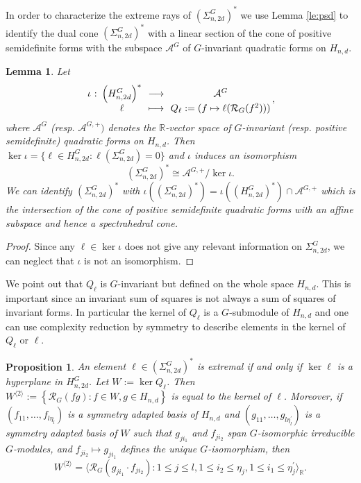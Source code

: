 \documentclass[11pt,a4paper]{amsart}
\newcommand{\abb}[5]{%
\setlength{\arraycolsep}{0.4ex}%
\begin{array}{rcccc}%
#1 &:\,& #2 & \,\,\longrightarrow\,\, & #3 \\[0.5ex]%
     & & #4 & \longmapsto & #5%
\end{array}%
}
\numberwithin{equation}{section}
\newtheorem{prop}[thm]{Proposition}
\newtheorem{lemma}[thm]{Lemma}
\theoremstyle{definition}
\newcommand{\R}{\mathbb{R}}
\numberwithin{thm}{section}
\theoremstyle{break}
\numberwithin{subcase}{case}
\begin{document}
In order to characterize the extreme rays of $\left( \Sigma_{n,2d}^G\right)^\ast$ we use Lemma \ref{le:psd} to identify the dual cone $\left( \Sigma_{n,2d}^G\right)^\ast$ with a linear section of the cone of positive semidefinite forms with the subspace $\mathcal{A}^{G}$ of $G$-invariant quadratic forms on $H_{n,d}$.

\begin{lemma}\label{Rmk:BoundaryOfPSD}
Let $$\abb{\iota}{\left(H_{n,2d}^G\right)^\ast}{\mathcal{A}^G}{\ell}{Q_\ell := ( f \mapsto \ell (\mathcal{R}_G (f^2) ))},$$
where $\mathcal{A}^G$ (resp. $\mathcal{A}^{G,+})$ denotes the $\R$-vector space of $G$-invariant (resp. positive semidefinite) quadratic forms on $H_{n,d}$. Then $\ker \iota = \{ \ell \in H_{n,2d}^G : \ell (\Sigma_{n,2d}^G) = 0 \}$ and $\iota$ induces an isomorphism $$\left(\Sigma_{n,2d}^G\right)^\ast \cong  \mathcal{A}^{G,+} / \ker \iota.$$ We can identify $\left( \Sigma_{n,2d}^G \right)^\ast$ with $\iota \left( \left( \Sigma_{n,2d}^G \right)^\ast\right) = \iota \left( \left( H_{n,2d}^G \right)^\ast\right) \cap \mathcal{A}^{G,+}$ which is the intersection of the cone of positive semidefinite quadratic forms with an affine subspace and hence a spectrahedral cone.
\end{lemma}
\begin{proof}
Since any $\ell \in \ker \iota$ does not give any relevant information on $\Sigma_{n,2d}^G$, we can neglect that $\iota$ is not an isomorphism.
\end{proof}
We point out that $Q_\ell$ is $G$-invariant but defined on the whole space $H_{n,d}$. This is important since an invariant sum of squares is not always a sum of squares of invariant forms.
In particular the kernel of $Q_\ell$ is a $G$-submodule of $H_{n,d}$ and one can use complexity reduction by symmetry to describe elements in the kernel of $Q_\ell$ or $\ell$.
\begin{prop} \label{prop:W2}
An element $\ell \in \left( \Sigma_{n,2d}^G \right)^\ast$ is extremal if and only if $\ker \ell$ is a hyperplane in $H_{n,2d}^G$. Let $W := \ker {Q}_\ell$. Then $W^{\langle 2 \rangle} := \left\{\mathcal{R}_G (fg) : f \in W, g \in H_{n,d} \right\}$ is equal to the kernel of $\ell$. Moreover, if $\left(f_{11},\ldots,f_{l\eta_l}\right)$ is a symmetry adapted basis of $H_{n,d}$ and $\left(g_{11},\ldots,g_{l\eta^\prime_l}\right)$ is a symmetry adapted basis of $W$ such that $g_{ji_1}$ and $f_{ji_2}$ span $G$-isomorphic irreducible $G$-modules, and $f_{ji_2} \mapsto g_{ji_1}$ defines the unique $G$-isomorphism, then $$W^{\langle 2 \rangle} = \langle \mathcal{R}_G( g_{ji_1}\cdot f_{ji_2}) : 1 \leq j \leq l, 1 \leq i_2\leq \eta_j, 1\leq i_1 \leq \eta_j^\prime \rangle_\R.$$
\end{prop}
\end{document}
